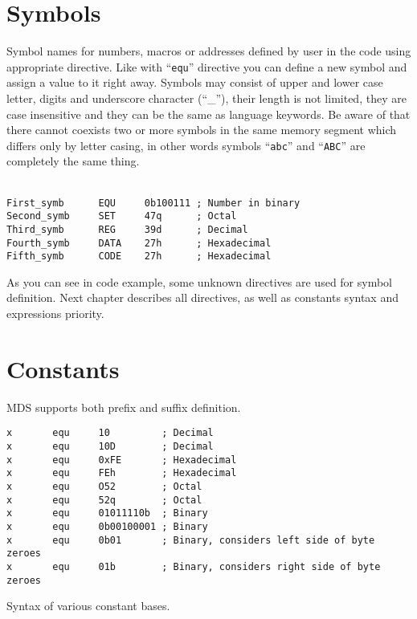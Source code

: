 \section{Symbols}
    Symbol names for numbers, macros or addresses defined by user in the code using appropriate directive. Like with ``\texttt{equ}'' directive you can define a new symbol and assign a value to it right away. Symbols may consist of upper and lower case letter, digits and underscore character (``\_''), their length is not limited, they are case insensitive and they can be the same as language keywords. Be aware of that there cannot coexists two or more symbols in the same memory segment which differs only by letter casing, in other words symbols ``\texttt{abc}'' and ``\texttt{ABC}'' are completely the same thing.

    ~\\
    {
        \usecodefont
        \verb'First_symb      EQU     0b100111 ; Number in binary'\\
        \verb'Second_symb     SET     47q      ; Octal'\\
        \verb'Third_symb      REG     39d      ; Decimal'\\
        \verb'Fourth_symb     DATA    27h      ; Hexadecimal'\\
        \verb'Fifth_symb      CODE    27h      ; Hexadecimal'
    }

    As you can see in code example, some unknown directives are used for symbol definition. Next chapter describes all directives, as well as constants syntax and expressions priority.

\section{Constants}
    MDS supports both prefix and suffix definition.

    \begin{code}[h!]
    {
        \usecodefont

        \verb'x       equ     10         ; Decimal'\\
        \verb'x       equ     10D        ; Decimal'\\
        \verb'x       equ     0xFE       ; Hexadecimal'\\
        \verb'x       equ     FEh        ; Hexadecimal'\\
        \verb'x       equ     O52        ; Octal'\\
        \verb'x       equ     52q        ; Octal'\\
        \verb'x       equ     01011110b  ; Binary'\\
        \verb'x       equ     0b00100001 ; Binary'\\
        \verb'x       equ     0b01       ; Binary, considers left side of byte zeroes'\\
        \verb'x       equ     01b        ; Binary, considers right side of byte zeroes'

        \caption{Syntax of various constant bases.}
        \label{code:svcb}
    }
    \end{code}

